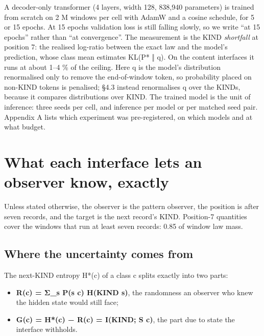 \documentclass[10pt]{article}
\providecommand{\tightlist}{\setlength{\itemsep}{0pt}\setlength{\parskip}{0pt}}
\begin{document}
A decoder-only transformer (4 layers, width 128, 838,940 parameters) is trained from scratch on 2 M windows per cell
with AdamW and a cosine schedule, for 5 or 15 epochs. At 15 epochs validation loss is still falling slowly, so we write
``at 15 epochs'' rather than ``at convergence''. The measurement is the KIND \emph{shortfall} at position 7: the realised
log-ratio between the exact law and the model's prediction, whose class mean estimates KL(P* ‖ q). On the content
interfaces it runs at about 1--4 \% of the ceiling. Here q is the model's distribution renormalised only to remove the
end-of-window token, so probability placed on non-KIND tokens is penalised; §4.3 instead renormalises q over the KINDs,
because it compares distributions over KIND. The trained model is the unit of inference: three seeds per cell, and
inference per model or per matched seed pair. Appendix A lists which experiment was pre-registered, on which models and
at what budget.

\hypertarget{what-each-interface-lets-an-observer-know-exactly}{%
\section{What each interface lets an observer know, exactly}\label{what-each-interface-lets-an-observer-know-exactly}}

Unless stated otherwise, the observer is the pattern observer, the position is after seven records, and the target is
the next record's KIND. Position-7 quantities cover the windows that run at least seven records: 0.85 of window law
mass.

\hypertarget{where-the-uncertainty-comes-from}{%
\subsection{Where the uncertainty comes from}\label{where-the-uncertainty-comes-from}}

The next-KIND entropy H*(c) of a class c splits exactly into two parts:

\begin{itemize}
\tightlist
\item
  \textbf{R(c) = Σ\_s P(s \textbar{} c) H(KIND \textbar{} s)}, the randomness an observer who knew the hidden state would still face;
\item
  \textbf{G(c) = H*(c) − R(c) = I(KIND; S \textbar{} c)}, the part due to state the interface withholds.
\end{itemize}
\end{document}
